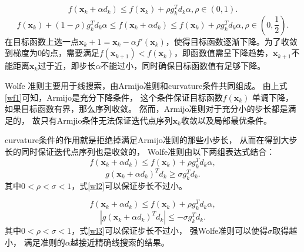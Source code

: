 \begin{definition}\cite{1980Curvilinear}
    \begin{equation}
        f(\bm{x}_k+\alpha d_k) \leq f(\bm{x}_k) + \rho g_k^Td_k\alpha, \rho\in(0,1).
        \label{wf1}
    \end{equation}
    \begin{equation}
        f(\bm{x}_k) + (1 - \rho) g_k^Td_k\alpha \leq 
        f(\bm{x}_k+\alpha d_k) \leq 
        f(\bm{x}_k) + \rho g_k^Td_k\alpha, 
        \rho\in(0,\displaystyle\frac{1}{2}).
        \nonumber
    \end{equation}
    在目标函数上选一点$\bm{x}_k+1=\bm{x}_k−\alpha f′(\bm{x}_k)$，使得目标函数逐渐下降。为了收敛到梯度为0的点，需要满足$f(\bm{x}_{k+1})<f(\bm{x}_k)$，即函数值需呈下降趋势，$\bm{x}_{k+1}$不能距离$\bm{x}_k$过于近，即步长$\alpha$不能过小，同时确保目标函数值有足够下降。
\end{definition}

\begin{definition}[Wolfe准则]

    Wolfe 准则主要用于线搜索，由Armijo准则和curvature条件共同组成。
    由上式\ref{wf1}可知，Armijo是充分下降条件，
    这个条件保证目标函数$f(\bm{x}_k)$ 单调下降，
    如果目标函数有界，那么序列收敛。
    然而，Armijo准则对于充分小的步长都是满足的，
    故只有Armjio条件无法保证迭代点序列$\bm{x}_k$收敛以及局部最优条件。

    curvature条件的作用就是拒绝掉满足Armijo准则的那些小步长，
    从而在得到大步长的同时保证迭代点序列也是收敛的，
    Wolfe准则由以下两组表达式结合：
    \begin{equation}
        f(\bm{x}_k+\alpha d_k) \leq f(\bm{x}_k) + \rho g_k^Td_k\alpha,
        \nonumber 
    \end{equation}
    \begin{equation}
        g(\bm{x}_k+\alpha d_k)^Td_k \geq \sigma g_k^Td_k.
        \label{wl2}
    \end{equation}
    其中$0 < \rho < \sigma < 1$，式\ref{wl2}可以保证步长不过小。
\end{definition}

\begin{definition}[强Wolfe准则]
    \begin{equation}
        f(\bm{x}_k+\alpha d_k) \leq f(\bm{x}_k) + \rho g_k^Td_k\alpha,
        \nonumber 
    \end{equation}
    \begin{equation}
        |g(\bm{x}_k+\alpha d_k)^Td_k| \leq -\sigma g_k^Td_k.
        \label{wl3}
    \end{equation}
    其中$0 < \rho < \sigma < 1$，式\ref{wl3}可以保证步长不过小，
    强Wolfe准则可以使得$\sigma$取得越小，
    满足准则的$\alpha$越接近精确线搜索的结果。
\end{definition}


